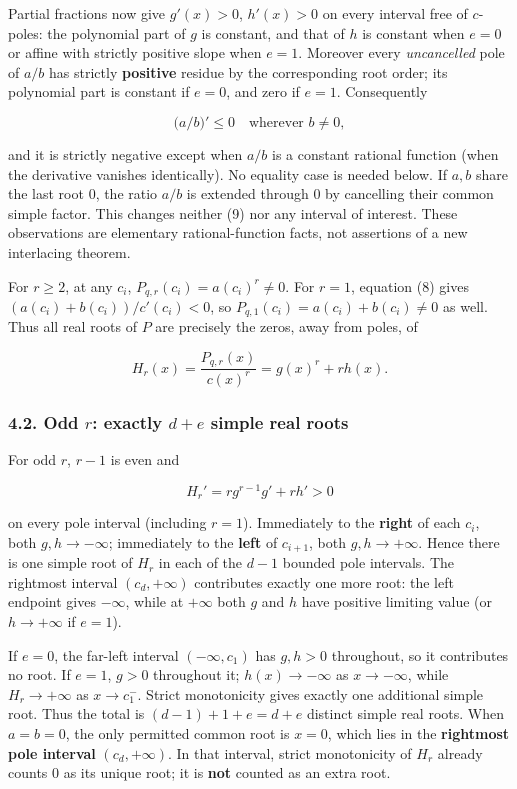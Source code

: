 \documentclass[
  10pt,
]{article}
\begin{document}
Partial fractions now give \(g'(x)>0\), \(h'(x)>0\) on every interval
free of \(c\)-poles: the polynomial part of \(g\) is constant, and that
of \(h\) is constant when \(e=0\) or affine with strictly positive slope
when \(e=1\). Moreover every \emph{uncancelled} pole of \(a/b\) has
strictly \textbf{positive} residue by the corresponding root order; its
polynomial part is constant if \(e=0\), and zero if \(e=1\).
Consequently

\[
 \bigl(a/b\bigr)'\le0\quad\text{wherever }b\ne0,
 \tag{9}
\]

and it is strictly negative except when \(a/b\) is a constant rational
function (when the derivative vanishes identically). No equality case is
needed below. If \(a,b\) share the last root \(0\), the ratio \(a/b\) is
extended through \(0\) by cancelling their common simple factor. This
changes neither (9) nor any interval of interest. These observations are
elementary rational-function facts, not assertions of a new interlacing
theorem.

For \(r\ge2\), at any \(c_i\), \(P_{q,r}(c_i)=a(c_i)^r\ne0\).
For \(r=1\), equation (8) gives \((a(c_i)+b(c_i))/c'(c_i)<0\),
so \(P_{q,1}(c_i)=a(c_i)+b(c_i)\ne0\) as well. Thus all real roots of
\(P\) are precisely the zeros, away from poles, of

\[
 H_r(x)=\frac{P_{q,r}(x)}{c(x)^r}=g(x)^r+r h(x).
 \tag{10}
\]

\subsubsection{\texorpdfstring{4.2. Odd \(r\): exactly \(d+e\) simple
real
roots}{4.2. Odd r: exactly d+e simple real roots}}\label{odd-r-exactly-de-simple-real-roots}

For odd \(r\), \(r-1\) is even and

\[
 H_r'=r g^{r-1}g'+r h'>0
\]

on every pole interval (including \(r=1\)). Immediately to the
\textbf{right} of each \(c_i\), both \(g,h\to-\infty\); immediately to
the \textbf{left} of \(c_{i+1}\), both \(g,h\to+\infty\). Hence there is
one simple root of \(H_r\) in each of the \(d-1\) bounded pole
intervals. The rightmost interval \((c_d,+\infty)\) contributes exactly
one more root: the left endpoint gives \(-\infty\), while at \(+\infty\)
both \(g\) and \(h\) have positive limiting value (or \(h\to+\infty\) if
\(e=1\)).

If \(e=0\), the far-left interval \((-\infty,c_1)\) has \(g,h>0\)
throughout, so it contributes no root. If \(e=1\), \(g>0\) throughout
it; \(h(x)\to-\infty\) as \(x\to-\infty\), while \(H_r\to+\infty\) as
\(x\to c_1^-\). Strict monotonicity gives exactly one additional simple
root. Thus the total is \((d-1)+1+e=d+e\) distinct simple real roots.
When \(a=b=0\), the only permitted common root is \(x=0\), which lies in
the \textbf{rightmost pole interval} \((c_d,+\infty)\). In that
interval, strict monotonicity of \(H_r\) already counts \(0\) as its
unique root; it is \textbf{not} counted as an extra root.
\end{document}
